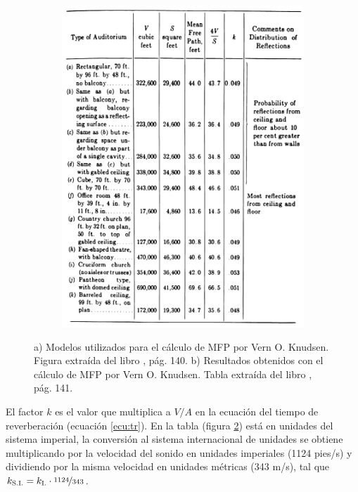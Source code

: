 \begin{figure}[ht]
\begin{subfigure}[b]{0.48\textwidth}
    \end{subfigure}
    ~ %
    \begin{subfigure}[b]{0.48\textwidth}
    	\centering
        \includegraphics[width=0.9\linewidth]{archivos/mfpknudsen2.pdf}
        \caption{}
        \label{fig:knudsen2}
    \end{subfigure}
    \caption{a) Modelos utilizados para el cálculo de MFP por Vern O. Knudsen. Figura extraída del libro \cite{Knudsen1932}, pág. 140. b) Resultados obtenidos con el cálculo de MFP por Vern O. Knudsen. Tabla extraída del libro \cite{Knudsen1932}, pág. 141.}
\end{figure}
\FloatBarrier 

El factor $k$ es el valor que multiplica a $V/A$ en la ecuación del tiempo de reverberación (ecuación \ref{ecu:tr}). En la tabla (figura \ref{fig:knudsen2}) está en unidades del sistema imperial, la conversión al sistema internacional de unidades se obtiene multiplicando por la velocidad del sonido en unidades imperiales (1124 pies/s) y dividiendo por la misma velocidad en unidades métricas (343 m/s), tal que $k_\text{S.I.} = k_\text{I.}\cdot\nicefrac{1124}{343}$.


